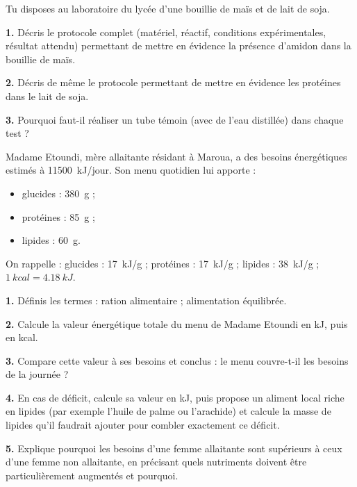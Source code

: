 \documentclass[11pt]{article}
\newcounter{popsec}
\newcounter{popsub}
\newcommand{\courssub}[1]{%
  \stepcounter{popsub}%
  \par\vspace{9pt}\noindent{\popxbold\fontsize{11.5}{13}\selectfont\color{popink}{\color{poporange}\thepopsec.\thepopsub}\hspace{6pt}#1}\par\nopagebreak\vspace{4pt}
}
\begin{document}
\begin{exercice}
Tu disposes au laboratoire du lycée d'une bouillie de maïs et de lait de soja.

\textbf{1.} Décris le protocole complet (matériel, réactif, conditions expérimentales, résultat attendu) permettant de mettre en évidence la présence d'amidon dans la bouillie de maïs.

\textbf{2.} Décris de même le protocole permettant de mettre en évidence les protéines dans le lait de soja.

\textbf{3.} Pourquoi faut-il réaliser un tube témoin (avec de l'eau distillée) dans chaque test ?
\end{exercice}

\courssub{Je me prépare au Probatoire}

\begin{exercice}
Madame Etoundi, mère allaitante résidant à Maroua, a des besoins énergétiques estimés à \SI{11500}{kJ/jour}. Son menu quotidien lui apporte :
\begin{itemize}
\item glucides : \SI{380}{g} ;
\item protéines : \SI{85}{g} ;
\item lipides : \SI{60}{g}.
\end{itemize}
On rappelle : glucides : \SI{17}{kJ/g} ; protéines : \SI{17}{kJ/g} ; lipides : \SI{38}{kJ/g} ; $\SI{1}{kcal} = \SI{4,18}{kJ}$.

\textbf{1.} Définis les termes : ration alimentaire ; alimentation équilibrée.

\textbf{2.} Calcule la valeur énergétique totale du menu de Madame Etoundi en kJ, puis en kcal.

\textbf{3.} Compare cette valeur à ses besoins et conclus : le menu couvre-t-il les besoins de la journée ?

\textbf{4.} En cas de déficit, calcule sa valeur en kJ, puis propose un aliment local riche en lipides (par exemple l'huile de palme ou l'arachide) et calcule la masse de lipides qu'il faudrait ajouter pour combler exactement ce déficit.

\textbf{5.} Explique pourquoi les besoins d'une femme allaitante sont supérieurs à ceux d'une femme non allaitante, en précisant quels nutriments doivent être particulièrement augmentés et pourquoi.
\end{exercice}
\end{document}
